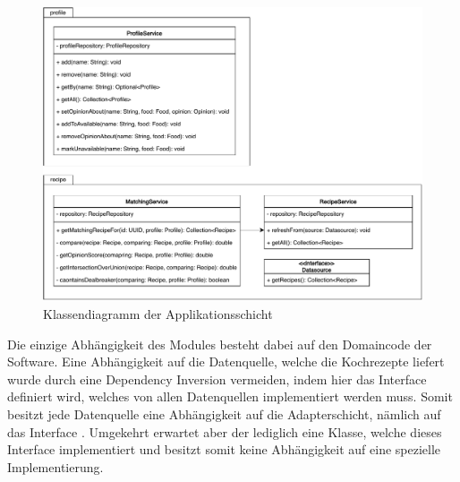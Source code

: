 \begin{figure}[ht!]
    \includegraphics[width=0.98\columnwidth]{../diagrams/application_uml.pdf}
    \caption{Klassendiagramm der Applikationsschicht}
    \label{fig:class-diag-application}
\end{figure}

Die einzige Abhängigkeit des Modules besteht dabei auf den Domaincode der Software. Eine Abhängigkeit auf die Datenquelle, welche die Kochrezepte liefert wurde durch eine Dependency Inversion vermeiden, indem hier das Interface \href{https://github.com/anditru/quickie/blob/bb41442c7f1ffbfcd3117cd86a40f7932e543a33/2-quickie-application/src/main/java/org/pinkcrazyunicorn/quickie/application/recipe/Datasource.java}{} definiert wird, welches von allen Datenquellen implementiert werden muss. Somit besitzt jede Datenquelle eine Abhängigkeit auf die Adapterschicht, nämlich auf das Interface \href{https://github.com/anditru/quickie/blob/bb41442c7f1ffbfcd3117cd86a40f7932e543a33/2-quickie-application/src/main/java/org/pinkcrazyunicorn/quickie/application/recipe/Datasource.java}{}. Umgekehrt erwartet aber der \href{https://github.com/anditru/quickie/blob/bb41442c7f1ffbfcd3117cd86a40f7932e543a33/2-quickie-application/src/main/java/org/pinkcrazyunicorn/quickie/application/recipe/RecipeService.java}{} lediglich eine Klasse, welche dieses Interface implementiert und besitzt somit keine Abhängigkeit auf eine spezielle Implementierung.

